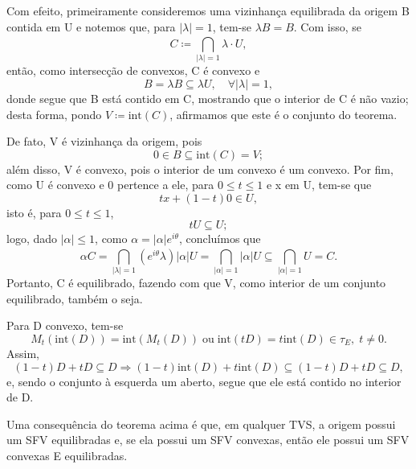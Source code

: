 \documentclass[../distribution_theory_notes.tex]{subfiles}
\begin{document}
\begin{proof*}
	Com efeito, primeiramente consideremos uma vizinhança equilibrada da origem B contida em U e notemos que, para \(|\lambda |=1\), tem-se \(\lambda B = B.\) Com isso, se
	\[
		C\coloneqq \bigcap_{|\lambda |=1}^{}\lambda \cdot U,
	\]
	então, como intersecção de convexos, C é convexo e
	\[
		B = \lambda B\subseteq \lambda U,\quad \forall |\lambda |=1,
	\]
	donde segue que B está contido em C, mostrando que o interior de C é não vazio; desta forma, pondo \(V\coloneqq \mathrm{int}(C)\), afirmamos que este é o conjunto do teorema.

	De fato, V é vizinhança da origem, pois
	\[
		0\in B\subseteq \mathrm{int}(C)=V;
	\]
	além disso, V é convexo, pois o interior de um convexo é um convexo. Por fim, como U é convexo e 0 pertence a ele, para \(0\leq t\leq 1\) e x em U, tem-se que
	\[
		tx + (1-t)0\in U,
	\]
	isto é, para \(0\leq t\leq 1\),
	\[
		tU\subseteq U;
	\]
	logo, dado \(|\alpha |\leq 1\), como \(\alpha =|\alpha |e^{i\theta }\), concluímos que
	\[
		\alpha C = \bigcap_{|\lambda |=1}^{}(e^{i\theta }\lambda )|\alpha |U = \bigcap_{|\alpha |=1}^{}|\alpha | U \subseteq \bigcap_{|\alpha |=1}^{}U = C.
	\]
	Portanto, C é equilibrado, fazendo com que V, como interior de um conjunto equilibrado, também o seja. \qedsymbol

\end{proof*}

\begin{tcolorbox}[
		skin=enhanced,
		title=Lembrete!,
		after title={\hfill Interior de Convexo},
		fonttitle=\bfseries,
		sharp corners=downhill,
		colframe=black,
		colbacktitle=yellow!75!white,
		colback=yellow!30,
		colbacklower=black,
		coltitle=black,
		drop large lifted shadow
	]
	Para D convexo, tem-se
	\[
		M_t(\mathrm{int}(D))=\mathrm{int}(M_t(D))\;\text{ou}\; \mathrm{int}(tD)=t \mathrm{int}(D)\in \tau_{E},\; t\neq 0.
	\]
	Assim,
	\[
		(1-t)D + tD\subseteq D \Rightarrow (1-t)\mathrm{int}(D)+t \mathrm{int}(D) \subseteq (1-t)D + tD \subseteq D,
	\]
	e, sendo o conjunto à esquerda um aberto, segue que ele está contido no interior de D.
\end{tcolorbox}

Uma consequência do teorema acima é que, em qualquer TVS, a origem possui um SFV equilibradas e, se ela possui um SFV convexas, então ele possui um SFV convexas E equilibradas.
\end{document}
